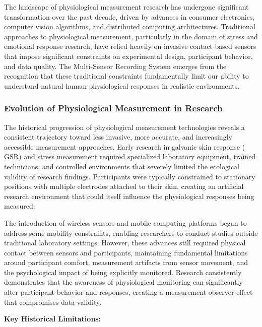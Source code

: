 \documentclass[11pt,a4paper]{report}
\begin{document}
The landscape of physiological measurement research has undergone significant transformation over the past decade,
driven by advances in consumer electronics, computer vision algorithms, and distributed computing architectures.
Traditional approaches to physiological measurement, particularly in the domain of stress and emotional response
research, have relied heavily on invasive contact-based sensors that impose significant constraints on experimental
design, participant behavior, and data quality. The Multi-Sensor Recording System emerges from the recognition that
these traditional constraints fundamentally limit our ability to understand natural human physiological responses in
realistic environments.

\subsubsection{Evolution of Physiological Measurement in Research}

The historical progression of physiological measurement technologies reveals a consistent trajectory toward less
invasive, more accurate, and increasingly accessible measurement approaches. Early research in galvanic skin response (
GSR) and stress measurement required specialized laboratory equipment, trained technicians, and controlled environments
that severely limited the ecological validity of research findings. Participants were typically constrained to
stationary positions with multiple electrodes attached to their skin, creating an artificial research environment that
could itself influence the physiological responses being measured.

The introduction of wireless sensors and mobile computing platforms began to address some mobility constraints, enabling
researchers to conduct studies outside traditional laboratory settings. However, these advances still required physical
contact between sensors and participants, maintaining fundamental limitations around participant comfort, measurement
artifacts from sensor movement, and the psychological impact of being explicitly monitored. Research consistently
demonstrates that the awareness of physiological monitoring can significantly alter participant behavior and responses,
creating a measurement observer effect that compromises data validity.

\textbf{Key Historical Limitations:}
\end{document}

